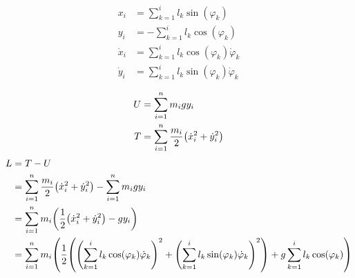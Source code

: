 \documentclass{article}
\renewcommand{\phi}{\varphi}
\begin{document}
\begin{align*}
  x_i &= \sum_{k=1}^i l_k \sin(\phi_k) \\
  y_i &= - \sum_{k=1}^i l_k \cos(\phi_k) \\
  \dot x_i &= \sum_{k=1}^i l_k \cos(\phi_k) \dot\phi_k \\
  \dot y_i &= \sum_{k=1}^i l_k \sin(\phi_k) \dot\phi_k \\
\end{align*}
\begin{align*}
  U &= \sum_{i=1}^n m_i g y_i \\
  T &= \sum_{i=1}^n \frac{m_i}{2} \pqty{\dot x_i^2 + \dot y_i^2} \\
\end{align*}
\begin{align*}
  L &= T - U \\
    &= \sum_{i=1}^n \frac{m_i}{2} \pqty{\dot x_i^2 + \dot y_i^2} - \sum_{i=1}^n m_i g y_i \\
    &= \sum_{i=1}^n m_i \pqty{\frac{1}{2} \pqty{\dot x_i^2 + \dot y_i^2} - g y_i} \\
    &= \sum_{i=1}^n m_i \pqty{\frac{1}{2} \pqty{{\pqty{\sum_{k=1}^i l_k \cos(\phi_k) \dot\phi_k}}^2 + {\pqty{\sum_{k=1}^i l_k \sin(\phi_k) \dot\phi_k}}^2} + g \sum_{k=1}^i l_k \cos(\phi_k)} \\
\end{align*}
\end{document}
